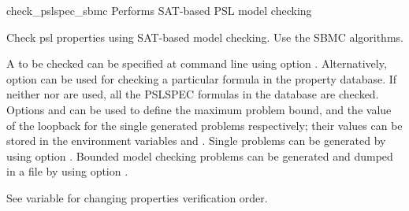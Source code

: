 \begin{nusmvCommand}{check\_pslspec\_sbmc} {Performs SAT-based PSL model checking}


Check psl properties using SAT-based model checking. Use the SBMC algorithms.

A \pslexpr to be checked can be specified at command line using option
. Alternatively, option  can be used for checking a
particular formula in the property database. If neither  nor
 are used, all the PSLSPEC formulas in the database are
checked. Options  and  can be used to define the
maximum problem bound, and the value of the loopback for the single generated
problems respectively; their values can be stored in the environment variables
 and . Single problems can be
generated by using option . Bounded model checking problems can
be generated and dumped in a file by using option .

See variable  for changing properties
verification order.

\begin{cmdOpt}






\end{cmdOpt}
\end{nusmvCommand}
